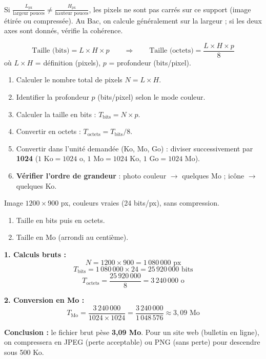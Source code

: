 \documentclass[11pt]{article}
\newcounter{popsec}
\newcounter{popsub}
\newcommand{\courssub}[1]{%
  \stepcounter{popsub}%
  \par\vspace{9pt}\noindent{\popxbold\fontsize{11.5}{13}\selectfont\color{popink}{\color{poporange}\thepopsec.\thepopsub}\hspace{6pt}#1}\par\nopagebreak\vspace{4pt}
}
\begin{document}
\begin{attention}
Si $\frac{L_{\text{px}}}{\text{largeur pouces}} \neq \frac{H_{\text{px}}}{\text{hauteur pouces}}$, les pixels ne sont pas carrés sur ce support (image étirée ou compressée). Au Bac, on calcule généralement sur la largeur ; si les deux axes sont donnés, vérifie la cohérence.
\end{attention}

\courssub{Taille d'un fichier image}

\begin{propriete}
\[
\text{Taille (bits)} = L \times H \times p
\qquad\Rightarrow\qquad
\text{Taille (octets)} = \frac{L \times H \times p}{8}
\]
où $L \times H$ = définition (pixels), $p$ = profondeur (bits/pixel).
\end{propriete}

\begin{methode}
\begin{enumerate}
\item Calculer le nombre total de pixels $N = L \times H$.
\item Identifier la profondeur $p$ (bits/pixel) selon le mode couleur.
\item Calculer la taille en bits : $T_{\text{bits}} = N \times p$.
\item Convertir en octets : $T_{\text{octets}} = T_{\text{bits}} / 8$.
\item Convertir dans l'unité demandée (Ko, Mo, Go) : diviser successivement par \textbf{1024} ($1 \text{ Ko} = 1024 \text{ o}$, $1 \text{ Mo} = 1024 \text{ Ko}$, $1 \text{ Go} = 1024 \text{ Mo}$).
\item \textbf{Vérifier l'ordre de grandeur} : photo couleur $\to$ quelques Mo ; icône $\to$ quelques Ko.
\end{enumerate}
\end{methode}

\begin{exoresolu}
Image $1200 \times 900$ px, couleurs vraies (24 bits/px), sans compression.
\begin{enumerate}
\item Taille en bits puis en octets.
\item Taille en Mo (arrondi au centième).
\end{enumerate}
\tcblower
\textbf{1. Calculs bruts :}
\[
N = 1200 \times 900 = 1\,080\,000 \text{ px}
\]
\[
T_{\text{bits}} = 1\,080\,000 \times 24 = 25\,920\,000 \text{ bits}
\]
\[
T_{\text{octets}} = \frac{25\,920\,000}{8} = 3\,240\,000 \text{ o}
\]

\textbf{2. Conversion en Mo :}
\[
T_{\text{Mo}} = \frac{3\,240\,000}{1024 \times 1024} = \frac{3\,240\,000}{1\,048\,576} \approx 3,09 \text{ Mo}
\]

\textbf{Conclusion :} le fichier brut pèse \textbf{3,09 Mo}. Pour un site web (bulletin en ligne), on compressera en JPEG (perte acceptable) ou PNG (sans perte) pour descendre sous 500 Ko.
\end{exoresolu}
\end{document}
